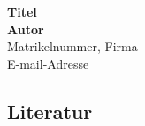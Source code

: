 \documentclass[a4paper, german, 10pt]{extarticle}
\begin{document}
\let\stdsection\section
\renewcommand{\section}[1]{\begin{center}\stdsection*{#1}\end{center}}

\let\stdsubsection\subsection
\renewcommand\subsection{\stdsubsection*}

\begin{center}
	\textbf{\Large{Titel}}\\
	\vspace{0.5cm}
	\textbf{\large{Autor}}\\
	\vspace{0.2cm}
	\large{Matrikelnummer, Firma}\\
	\vspace{0.2cm}
	\large{E-mail-Adresse}\\
	\vspace{0.8cm}
\end{center}

\begin{multicols}{2}

\small

\normalsize



\section{Literatur}



\end{multicols}


%
%
\end{document}

